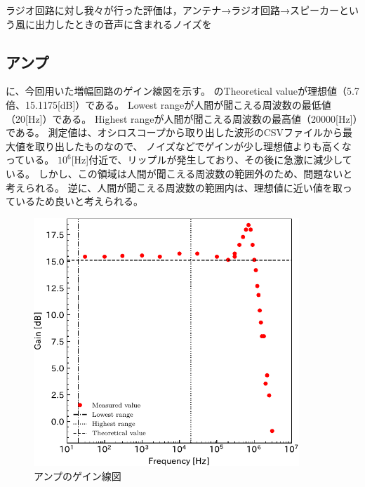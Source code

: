 \documentclass[report.tex]{subfiles}
\begin{document}
ラジオ回路に対し我々が行った評価は，アンテナ→ラジオ回路→スピーカーという風に出力したときの音声に含まれるノイズを

\subsection{アンプ}

に、今回用いた増幅回路のゲイン線図を示す。
のTheoretical valueが理想値（5.7倍、15.1175[dB]）である。
Lowest rangeが人間が聞こえる周波数の最低値（20[Hz]）である。
Highest rangeが人間が聞こえる周波数の最高値（20000[Hz]）である。
測定値は、オシロスコープから取り出した波形のCSVファイルから最大値を取り出したものなので、
ノイズなどでゲインが少し理想値よりも高くなっている。
\(10^6\)[Hz]付近で、リップルが発生しており、その後に急激に減少している。
しかし、この領域は人間が聞こえる周波数の範囲外のため、問題ないと考えられる。
逆に、人間が聞こえる周波数の範囲内は、理想値に近い値を取っているため良いと考えられる。

\begin{figure}[H]
	\centering
	\includegraphics[width=10cm]{fig/gain.pdf}
	\caption{アンプのゲイン線図}
	\label{fig:gain}
\end{figure}
\end{document}
